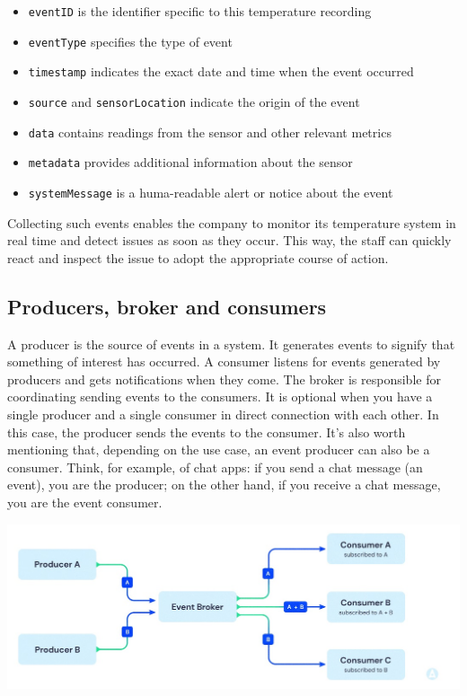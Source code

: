 \documentclass[twocolumn]{article}
\begin{document}
\begin{itemize}
     \item \texttt{eventID} is the identifier specific to this temperature recording
     \item \texttt{eventType} specifies the type of event
     \item \texttt{timestamp} indicates the exact date and time when the event occurred
     \item \texttt{source} and \texttt{sensorLocation} indicate the origin of the event
     \item \texttt{data} contains readings from the sensor and other relevant metrics
     \item \texttt{metadata} provides additional information about the sensor
     \item \texttt{systemMessage} is a huma-readable alert or notice about the event
\end{itemize}

Collecting such events enables the company to monitor its temperature system in real time and detect issues as soon as they occur. This way, the staff can quickly react and inspect the issue to adopt the appropriate course of action.

\subsection{Producers, broker and consumers}

A producer is the source of events in a system. It generates events to signify that something of interest has occurred.  
A consumer listens for events generated by producers and gets notifications when they come. \cite{quixWhatEventdriven}
The broker is responsible for coordinating sending events to the consumers. It is optional when you have a single producer and a single consumer in direct connection with each other. In this case, the producer sends the events to the consumer. \cite{adservioEventDrivenArchitecture}
It’s also worth mentioning that, depending on the use case, an event producer can also be a consumer. Think, for example, of chat apps: if you send a chat message (an event), you are the producer; on the other hand, if you receive a chat message, you are the event consumer. \cite{quixWhatEventdriven}

\begin{center}
     \includegraphics[width=\linewidth]{img/producer-broker-consumer.jpg}
\end{center}
\end{document}
